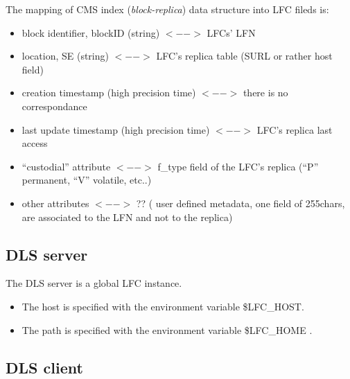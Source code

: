 \documentclass[pdftex]{cmspaper}
\begin{document}
The mapping of CMS index ({\em block-replica}) data structure into LFC fileds is: 
\begin{itemize}
\item block identifier, blockID  (string) $<-->$ LFCs' LFN
\item location, SE (string)  $<-->$ LFC's replica table (SURL or rather host field)
\item creation timestamp  (high precision time) $<-->$ there is no correspondance
\item last update timestamp (high precision time) $<-->$ LFC's replica last access
\item ``custodial'' attribute $<-->$ f\_type field of the LFC's replica (``P'' permanent, ``V'' volatile, etc..) 
\item other attributes  $<-->$ ?? ( user defined metadata, one field of 255chars, are associated to the LFN and not to the replica)
\end{itemize}


\subsection{DLS server}
 The DLS server is a global LFC instance. 
 \begin{itemize}
 \item The host is specified with the environment variable \$LFC\_HOST. 
 \item The path is specified with the environment variable \$LFC\_HOME .

 \end{itemize}

\subsection{DLS client}
\end{document}
